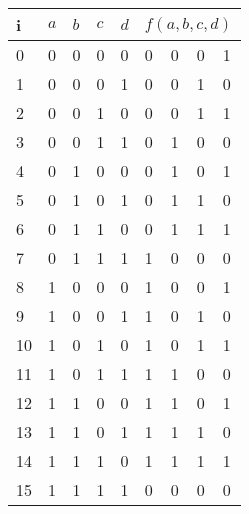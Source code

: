 \begin{tabular}{|l||l|l|l|l||l|l|l|l|}\hline
i & $a$ & $b$ & $c$ & $d$ & \multicolumn{4}{|c|}{$f(a,b,c,d)$} \\\hline\hline
0 & 0 & 0 & 0 & 0 &    0 & 0 & 0 & 1 \\\hline
1 & 0 & 0 & 0 & 1 &    0 & 0 & 1 & 0 \\\hline
2 & 0 & 0 & 1 & 0 &    0 & 0 & 1 & 1 \\\hline
3 & 0 & 0 & 1 & 1 &    0 & 1 & 0 & 0 \\\hline
4 & 0 & 1 & 0 & 0 &    0 & 1 & 0 & 1 \\\hline
5 & 0 & 1 & 0 & 1 &    0 & 1 & 1 & 0 \\\hline
6 & 0 & 1 & 1 & 0 &    0 & 1 & 1 & 1 \\\hline
7 & 0 & 1 & 1 & 1 &    1 & 0 & 0 & 0 \\\hline
8 & 1 & 0 & 0 & 0 &    1 & 0 & 0 & 1 \\\hline
9 & 1 & 0 & 0 & 1 &    1 & 0 & 1 & 0 \\\hline
10 & 1 & 0 & 1 & 0 &   1 & 0 & 1 & 1 \\\hline
11 & 1 & 0 & 1 & 1 &   1 & 1 & 0 & 0 \\\hline
12 & 1 & 1 & 0 & 0 &   1 & 1 & 0 & 1 \\\hline
13 & 1 & 1 & 0 & 1 &   1 & 1 & 1 & 0 \\\hline
14 & 1 & 1 & 1 & 0 &   1 & 1 & 1 & 1 \\\hline
15 & 1 & 1 & 1 & 1 &   0 & 0 & 0 & 0 \\\hline
\end{tabular}



